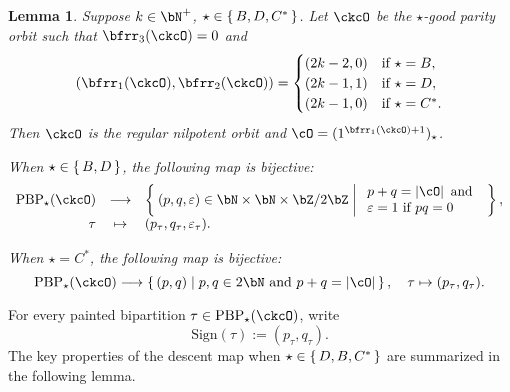 \documentclass[12pt,a4paper]{amsart}
\def\abs#1{\left|{#1}\right|}
\numberwithin{equation}{section}
\newtheorem{lem}[thm]{Lemma}
\theoremstyle{remark}
\def\ssign{\mathrm{Sign}}
\def\PBP{\mathrm{PBP}}
\begin{document}
\begin{lem}
\label{lem:D.sign}
  Suppose $k\in \bN^{+}$, $\star\in \set{B,D,C^{*}}$. Let $\ckcO$ be the
    $\star$-good parity orbit such that   $\bfrr_{3}(\ckcO)=0$ and
    \[
      (\bfrr_{1}(\ckcO), \bfrr_{2}(\ckcO))
      =
      \begin{cases}
        (2k-2,0) & \text{if } \star=B,\\
        (2k-1,1) & \text{if } \star=D,\\
        (2k-1,0) & \text{if } \star=C^{*}.\\
      \end{cases}
    \]
    Then $\ckcO$ is the regular nilpotent orbit %
    and $\cO = (1^{\bfrr_{1}(\ckcO)+1})_{\star}$.

When $\star\in \set{B,D}$, the following map is bijective:
\[
  \begin{array}{rcl}
    \PBP_{\star}(\ckcO)& \longrightarrow& \Set{
    (p,q,\varepsilon) \in \bN\times\bN\times \bZ/2\bZ|
    \begin{array}{l}
    p+q=\abs{\cO} \text{ and }\\
    \varepsilon=1 \text{ if } pq=0\\
    \end{array}
    },\\
    \tau &  \mapsto & (p_{\tau},q_{\tau}, \varepsilon_{\tau}).
  \end{array}
\]

When $\star = C^{*}$, the following map is bijective:
\[
  \PBP_{\star}(\ckcO) \longrightarrow \set{(p,q)|p,q \in 2\bN \text{ and }
    p+q=\abs{\cO} }, \quad \tau \mapsto (p_{\tau},q_{\tau}).
\]
\end{lem}


For every painted bipartition $\tau\in \PBP_{\star}(\ckcO)$, write
\[
  \ssign(\tau):=(p_\tau, q_\tau).
\]
The key properties of the descent map when $\star\in
\set{D,B,C^*}$ are summarized in the following lemma.
\end{document}
